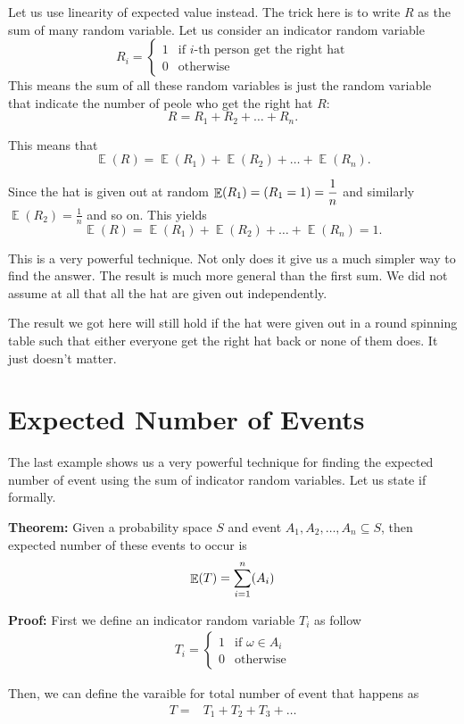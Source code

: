 \documentclass[a4paper, 12pt]{article}
\newcommand{\theorem}{\vspace{1em}\noindent\textbf{Theorem:} }
\renewcommand{\proof}{\vspace{0.5em}\noindent\textbf{Proof:} }
\let\Pr\relax
\DeclareMathOperator{\Pr}{Pr}
\DeclareMathOperator{\E}{\mathbb{E}}
\begin{document}
\begin{multicols}{2}
Let us use linearity of expected value instead. The trick here is to write $R$ as the sum of many random variable. Let us consider an indicator random variable
\[
	R_i = \begin{cases}
	1 & \text{if $i$-th person get the right hat}\\
	0 & \text{otherwise}
	\end{cases}
\]
This means the sum of all these random variables is just the random variable that indicate the number of peole who get the right hat $R$:
\[
	R = R_1 + R_2 + \ldots + R_n.
\]

This means that
\[
	\E(R) = \E(R_1) + \E(R_2) + \ldots + \E(R_n).
\]

Since the hat is given out at random $\displaystyle \E(R_1) = \Pr(R_1=1) = \frac{1}{n}$ and similarly $\displaystyle \E(R_2) = \frac{1}{n}$ and so on. This yields
\[
\E(R) = \E(R_1) + \E(R_2) + \ldots + \E(R_n) = 1.
\]

This is a very powerful technique. Not only does it give us a much simpler way to find the answer. The result is much  more general than the first sum. We did not assume at all that all the hat are given out independently.

The result we got here will still hold if the hat were given out in a round spinning table such that either everyone get the right hat back or none of them does. It just doesn't matter.

\section*{Expected Number of Events}
The last example shows us a very powerful technique for finding the expected number of event using the sum of indicator random variables. Let us state if formally.

\theorem Given a probability space $S$ and event $A_1, A_2, \ldots, A_n \subseteq S$, then expected number of these events to occur is
\[
	\E(T) = \sum_{i=1}^{n} \Pr(A_i)
\]

\proof First we define an indicator random variable $T_i$ as follow
\begin{align*}
	T_i = \begin{cases}
	1 & \text{if } \omega \in A_i\\
	0 & \text{otherwise}
	\end{cases}
\end{align*}

Then, we can define the varaible for total number of event that happens as
\begin{align*}
	T =& T_1 + T_2 + T_3 + \ldots
\end{align*}


\end{multicols}
\end{document}
